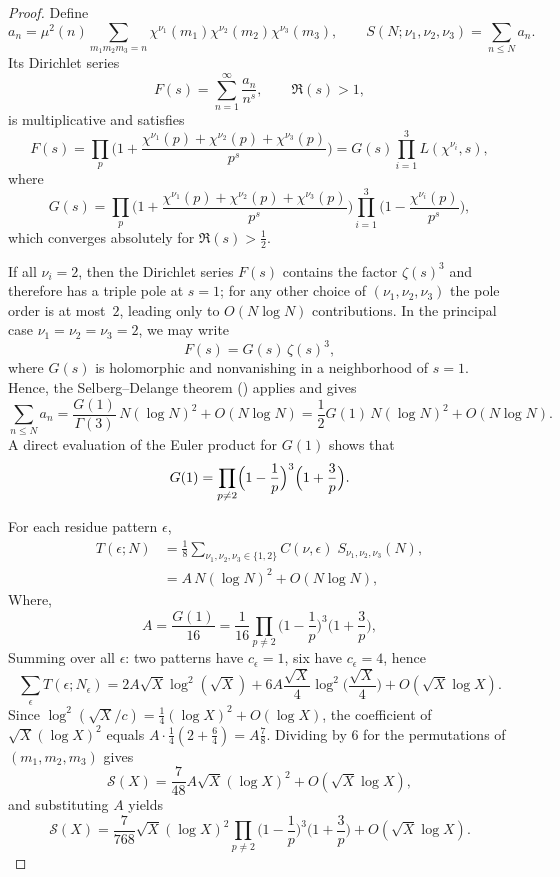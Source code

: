 \documentclass[12 pt]{amsart}
\newcommand{\cS}{\mathcal{S}}
\theoremstyle{definition}
\theoremstyle{remark}
\begin{document}
\begin{proof}
\noindent
Define
\[
a_n = \mu^2(n)\!\!\sum_{m_1 m_2 m_3 = n}
\chi^{\nu_1}(m_1)\chi^{\nu_2}(m_2)\chi^{\nu_3}(m_3), \qquad
S(N;\nu_1,\nu_2,\nu_3)=\sum_{n\le N}a_n.
\]
Its Dirichlet series
\[
F(s)=\sum_{n=1}^\infty\frac{a_n}{n^s},\qquad \Re(s)>1,
\]
is multiplicative and satisfies
\[
F(s)=\prod_{p}\Big(1+\frac{\chi^{\nu_1}(p)+\chi^{\nu_2}(p)+\chi^{\nu_3}(p)}{p^s}\Big)
=G(s)\prod_{i=1}^3L(\chi^{\nu_i},s),
\]
where
\[
G(s)=\prod_{p}\Bigg(1+\frac{\chi^{\nu_1}(p)+\chi^{\nu_2}(p)+\chi^{\nu_3}(p)}{p^s}\Bigg)
\prod_{i=1}^3\Big(1-\frac{\chi^{\nu_i}(p)}{p^s}\Big),
\]
which converges absolutely for $\Re(s)>\frac{1}{2}$.

If all $\nu_i=2$, then the Dirichlet series $F(s)$ contains the factor
$\zeta(s)^3$ and therefore has a triple pole at $s=1$; for any other choice
of $(\nu_1,\nu_2,\nu_3)$ the pole order is at most~$2$, leading only to
$O(N\log N)$ contributions.  In the principal case $\nu_1=\nu_2=\nu_3=2$,
we may write
\[
F(s)=G(s)\,\zeta(s)^3,
\]
where $G(s)$ is holomorphic and nonvanishing in a neighborhood of $s=1$.
Hence, the Selberg--Delange theorem
(\cite[Theorem~II.5.3]{Ten15book}) applies and gives
\[
\sum_{n\le N}a_n
= \frac{G(1)}{\Gamma(3)}\,N(\log N)^2 + O(N\log N)
= \frac{1}{2}G(1)\,N(\log N)^2 + O(N\log N).
\]
A direct evaluation of the Euler product for $G(1)$ shows that
\[
G(1)
= 
\prod_{p\neq 2}\Bigl(1-\frac{1}{p}\Bigr)^{3}
\Bigl(1+\frac{3}{p}\Bigr).
\]

For each residue pattern $\epsilon$,
\begin{align*}
T(\epsilon;N) 	&= \frac{1}{8}\sum_{\nu_1,\nu_2,\nu_3\in\{1,2\}}
C(\nu,\epsilon)\;
S_{\nu_1,\nu_2,\nu_3}(N),\\
&= A\,N(\log N)^2 + O(N\log N),
\end{align*}
Where,
\[
A=\frac{G(1)}{16}
=\frac{1}{16}\prod_{p\neq 2}\Big(1-\frac1p\Big)^3\Big(1+\frac3p\Big),
\]
Summing over all $\epsilon$: two patterns have $c_\epsilon=1$, six have
$c_\epsilon=4$, hence
\[
\sum_{\epsilon} T(\epsilon;N_\epsilon)
=2A\sqrt{X}\log^2(\sqrt{X})
+6A\frac{\sqrt{X}}{4}\log^2\!\Big(\frac{\sqrt{X}}{4}\Big)
+O(\sqrt{X}\log X).
\]
Since $\log^2(\sqrt{X}/c)=\tfrac14(\log X)^2+O(\log X)$,
the coefficient of $\sqrt{X}(\log X)^2$ equals $A\cdot\tfrac14(2+\tfrac64)=A\tfrac78$.
Dividing by $6$ for the permutations of $(m_1,m_2,m_3)$ gives
\[
\cS(X)
=\frac{7}{48} A \sqrt{X}(\log X)^2+O(\sqrt{X}\log X),
\]
and substituting $A$ yields
\[
\cS(X)
=\frac{7}{768}\sqrt{X}(\log X)^2
\prod_{p\neq 2}\Big(1-\frac1p\Big)^3\Big(1+\frac3p\Big)
+O(\sqrt{X}\log X).
\]

	
	
	
\end{proof}
\end{document}
